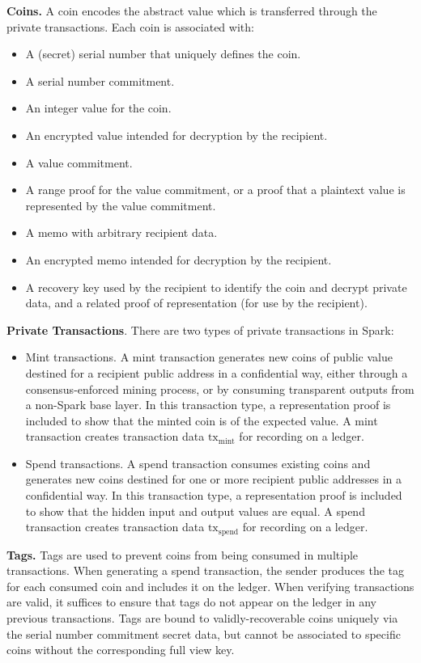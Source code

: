 \documentclass{llncs}
\begin{document}
\textbf{Coins.} A coin encodes the abstract value which is transferred through the private transactions. Each coin is associated with:
\begin{itemize}
\item A (secret) serial number that uniquely defines the coin.
\item A serial number commitment.
\item An integer value for the coin.
\item An encrypted value intended for decryption by the recipient.
\item A value commitment.
\item A range proof for the value commitment, or a proof that a plaintext value is represented by the value commitment.
\item A memo with arbitrary recipient data.
\item An encrypted memo intended for decryption by the recipient.
\item A recovery key used by the recipient to identify the coin and decrypt private data, and a related proof of representation (for use by the recipient).
\end{itemize}

\textbf{Private Transactions}. There are two types of private transactions in Spark:
\begin{itemize}
    \item Mint transactions.
    A mint transaction generates new coins of public value destined for a recipient public address in a confidential way, either through a consensus-enforced mining process, or by consuming transparent outputs from a non-Spark base layer.
    In this transaction type, a representation proof is included to show that the minted coin is of the expected value.
    A mint transaction creates transaction data $\text{tx}_{\text{mint}}$ for recording on a ledger.
    \item Spend transactions.
    A spend transaction consumes existing coins and generates new coins destined for one or more recipient public addresses in a confidential way.
    In this transaction type, a representation proof is included to show that the hidden input and output values are equal.
    A spend transaction creates transaction data $\text{tx}_{\text{spend}}$ for recording on a ledger.
\end{itemize}

\textbf{Tags.} Tags are used to prevent coins from being consumed in multiple transactions.
When generating a spend transaction, the sender produces the tag for each consumed coin and includes it on the ledger.
When verifying transactions are valid, it suffices to ensure that tags do not appear on the ledger in any previous transactions.
Tags are bound to validly-recoverable coins uniquely via the serial number commitment secret data, but cannot be associated to specific coins without the corresponding full view key.
\end{document}
